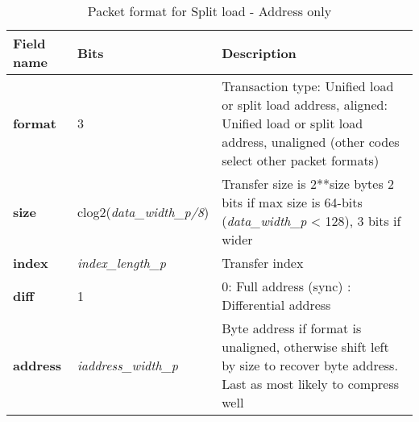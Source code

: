 \begin{table}[htp]
  \centering
  \caption{Packet format for Split load - Address only}
  \label{tab:te_datadx0y3}
  \begin{tabulary}{\textwidth}{|l|p{40mm}|p{90mm}|}
    \hline
    {\bf Field name} & {\bf Bits} & {\bf Description} \\
    \hline
    \textbf{format} & 	3	& Transaction type: Unified load or split load address, aligned: Unified load or split load address, unaligned\newline
		(other codes select other packet formats)\\
    \hline
    \textbf{size} & clog2(\textit{data\_width\_p/8}) & Transfer size is 2**size bytes	2 bits if max size is 64-bits (\textit{data\_width\_p} < 128), 3 bits if wider \\
    \hline
    \textbf{index} & \textit{index\_length\_p} & Transfer index\\
    \hline
    \textbf{diff} & 1 & 0: Full address (sync)	:  Differential address\\
    \hline
    \textbf{address} &  \textit {iaddress\_width\_p} & Byte address if format is unaligned, otherwise shift left by size to recover byte address. Last as most likely to compress well \\
    \hline
  \end{tabulary}
\end{table}

